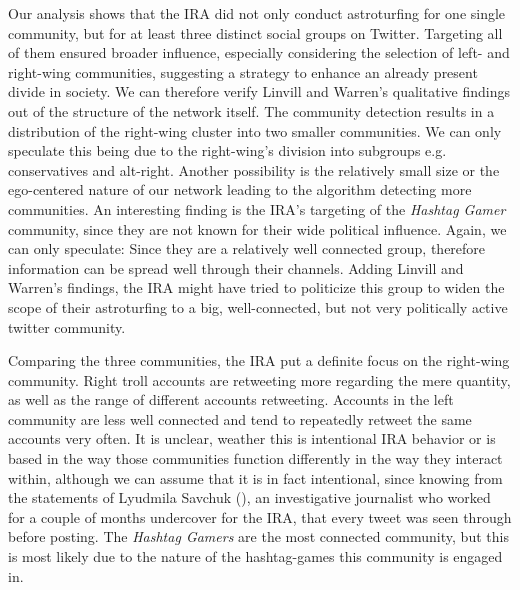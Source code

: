 \documentclass[12pt, titlepage=true, toc=bib]{scrartcl}
\begin{document}
Our analysis shows that the IRA did not only conduct astroturfing for one single community, but for at least three distinct social groups on Twitter. Targeting all of them ensured broader influence, especially considering the selection of left- and right-wing communities, suggesting a strategy to enhance an already present divide in society. We can therefore verify Linvill and Warren's qualitative findings out of the structure of the network itself. The community detection results in a distribution of the right-wing cluster into two smaller communities. We can only speculate this being due to the right-wing's division into subgroups e.g. conservatives and alt-right. Another possibility is the relatively small size or the ego-centered nature of our network leading to the algorithm detecting more communities. An interesting finding is the IRA's targeting of the \textit{Hashtag Gamer} community, since they are not known for their wide political influence. Again, we can only speculate: Since they are a relatively well connected group, therefore information can be spread well through their channels. Adding Linvill and Warren's findings, the IRA might have tried to politicize this group to widen the scope of their astroturfing to a big, well-connected, but not very politically active twitter community.

Comparing the three communities, the IRA put a definite focus on the right-wing community. Right troll accounts are retweeting more regarding the mere quantity, as well as the range of different accounts retweeting. Accounts in the left community are less well connected and tend to repeatedly retweet the same accounts very often. It is unclear, weather this is intentional IRA behavior or is based in the way those communities function differently in the way they interact within, although we can assume that it is in fact intentional, since knowing from the statements of Lyudmila Savchuk (\cite{savchuk_inside_2018}), an investigative journalist who worked for a couple of months undercover for the IRA, that every tweet was seen through before posting. The \textit{Hashtag Gamers} are the most connected community, but this is most likely due to the nature of the hashtag-games this community is engaged in.
\end{document}

